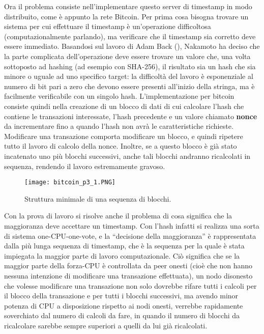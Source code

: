Ora il problema consiste nell'implementare questo server di timestamp in modo distribuito, come è appunto la rete Bitcoin. Per prima cosa bisogna trovare un sistema per cui effettuare il timestamp è un'operazione difficoltosa (computazionalmente parlando), ma verificare che il timestamp sia corretto deve essere immediato. Basandosi sul lavoro di Adam Back (\cite{hashcash}), Nakamoto ha deciso che la parte complicata dell'operazione deve essere trovare un valore che, una volta sottoposto ad hashing (ad esempio con SHA-256), il risultato sia un hash che sia minore o uguale ad uno specifico target: la difficoltà del lavoro è esponenziale al numero di bit pari a zero che devono essere presenti all'inizio della stringa, ma è facilmente verificabile con un singolo hash. L'implementazione per bitcoin consiste quindi nella creazione di un blocco di dati di cui calcolare l'hash che contiene le transazioni interessate, l'hash precedente e un valore chiamato \textbf{nonce} da incrementare fino a quando l'hash non avrà le caratteristiche richieste. Modificare una transazione comporta modificare un blocco, e quindi ripetere tutto il lavoro di calcolo della nonce. Inoltre, se a questo blocco è già stato incatenato uno più blocchi successivi, anche tali blocchi andranno ricalcolati in sequenza, rendendo il lavoro estremamente gravoso.

\begin{figure}[htbp]
\centering
\texttt{[image: bitcoin\_p3\_1.PNG]}
\caption{Struttura minimale di una sequenza di blocchi.\label{bitcoin_p3_1}}
\end{figure}

Con la prova di lavoro si risolve anche il problema di cosa significa che la maggioranza deve accettare un timestamp. Con l'hash infatti si realizza una sorta di sistema one-CPU-one-vote, e la ``decisione della maggioranza'' è rappresentata dalla più lunga sequenza di timestamp, che è la sequenza per la quale è stata impiegata la maggior parte di lavoro computazionale. Ciò significa che se la maggior parte della forza-CPU è controllata da peer onesti (cioè che non hanno nessuna intenzione di modificare una transazione effettuata), un nodo disonesto che volesse modificare una transazione non solo dovrebbe rifare tutti i calcoli per il blocco della transazione e per tutti i blocchi successivi, ma avendo minor potenza di CPU a disposizione rispetto ai nodi onesti, verrebbe rapidamente soverchiato dal numero di calcoli da fare, in quando il numero di blocchi da ricalcolare sarebbe sempre superiori a quelli da lui già ricalcolati.

